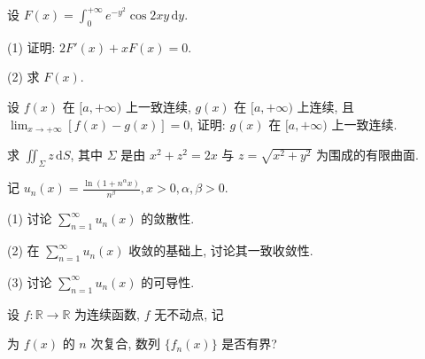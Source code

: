 设 $F(x) = \int_{0}^{+\infty} e^{-y^2} \cos 2xy \, \mathrm{d}y$.\par
(1) 证明: $2F'(x) + xF(x) = 0$.\par
(2) 求 $F(x)$.\par
设 $f(x)$ 在 $[a, +\infty)$ 上一致连续, $g(x)$ 在 $[a, +\infty)$ 上连续, 且 $\lim_{x \to +\infty} [f(x) - g(x)] = 0$, 证明: $g(x)$ 在 $[a, +\infty)$ 上一致连续.\par
求 $\iint_{\Sigma} z \, \mathrm{d}S$, 其中 $\Sigma$ 是由 $x^{2} + z^{2} = 2x$ 与 $z = \sqrt{x^{2} + y^{2}}$ 为围成的有限曲面.\par
记 $u_{n}(x) = \frac{\ln(1 + n^{\alpha}x)}{n^{\beta}}, x > 0, \alpha, \beta > 0.$\par
(1) 讨论 $\sum_{n=1}^{\infty} u_n(x)$ 的敛散性.\par
(2) 在 $\sum_{n=1}^{\infty} u_n(x)$ 收敛的基础上, 讨论其一致收敛性.\par
(3) 讨论 $\sum_{n=1}^{\infty} u_n(x)$ 的可导性.\par
\par{}
设 $f: \mathbb{R} \to \mathbb{R}$ 为连续函数, $f$ 无不动点, 记\par
\nopagebreak[4]
为 $f(x)$ 的 $n$ 次复合, 数列 $\{f_n(x)\}$ 是否有界?\par
